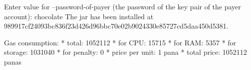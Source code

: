 \begin{shellbox}\begin{ttlst}
Enter value for --password-of-payer (the password of the key pair of the payer account): chocolate
The jar has been installed at 989917cf24093bc836f23d426d96bbc70e02b9024330e85727cd5daa450d5381.

Gas consumption:
 * total: 1052112
   * for CPU: 15715
   * for RAM: 5357
   * for storage: 1031040
   * for penalty: 0
 * price per unit: 1 pana
 * total price: 1052112 panas
\end{ttlst}\end{shellbox}
